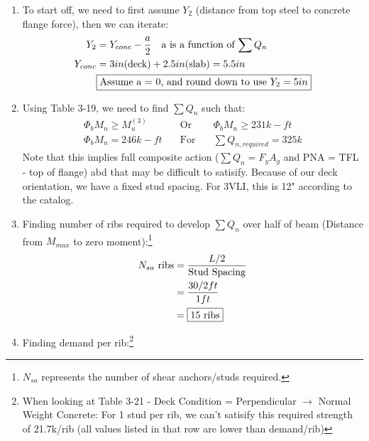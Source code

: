 \documentclass{report} %
\begin{document}
\begin{enumerate}
    \item To start off, we need to first assume $Y_2$ (distance from top steel to concrete flange force), then we can iterate:
        \begin{equation*}
            \begin{aligned}
                Y_2 &= Y_{conc} - \frac{a}{2} \quad \text{a is a function of $\sum Q_n$} \\
                Y_{conc} &= 3in\text{(deck)}  + 2.5in\text{(slab)} = 5.5in \\
                &\framebox{\text{Assume a = 0, and round down to use $Y_2 = 5in$}} 
            \end{aligned}
        \end{equation*}
    \item Using Table 3-19, we need to find $\sum Q_n$ such that:
        \begin{equation*}
            \begin{aligned}
               \Phi _b M_n \geq  M^{(3)}_u \quad &\text{Or}  \quad &\Phi _b M_n \geq 231k-ft \\
               \Phi _b M_n = 246k-ft \quad &\text{For} \quad &\sum Q_{n,required} = 325k
            \end{aligned}
        \end{equation*}
        Note that this implies full composite action ($\sum Q_n = F_yA_g$ and PNA = TFL - top of flange) abd that may be difficult to satisify. 
        \newline
        Because of our deck orientation, we have a fixed stud spacing. For 3VLI, this is 12" according to the catalog.
    \item Finding number of ribs required to develop $\sum Q_n$ over half of beam (Distance from $M_{max}$ to zero moment):\footnote{$N_{sa}$ represents the number of shear anchors/studs required.}
        \begin{equation*}
            \begin{aligned}
                N_{sa} \text{ ribs} &= \frac{L/2}{\text{Stud Spacing}} \\
                                    &= \frac{30/2ft}{1ft} \\
                                    &= \framebox{15 \text{ribs}}
            \end{aligned}
        \end{equation*}
    \item Finding demand per rib:\footnote{When looking at Table 3-21 - Deck Condition = Perpendicular $\rightarrow$ Normal Weight Concrete: For 1 stud per rib, we can't satisify this required strength of 21.7k/rib (all values listed in that row are lower than demand/rib)}

\end{enumerate}
\end{document}
